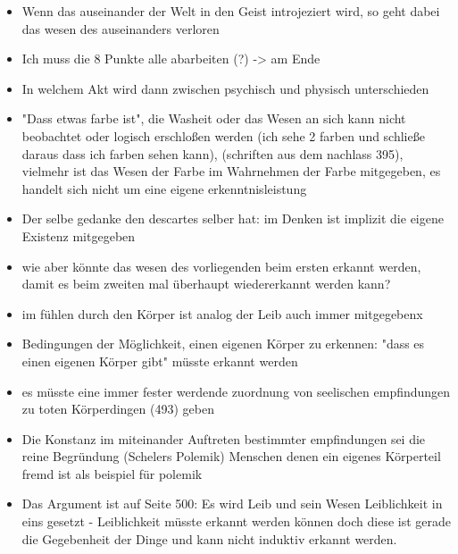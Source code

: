 \documentclass[a4paper, 12pt]{article}
\begin{document}
\begin{onehalfspace}
\begin{itemize}
  \item Wenn das auseinander der Welt in den Geist introjeziert wird, so geht dabei das wesen des auseinanders verloren 
  \item Ich muss die 8 Punkte alle abarbeiten (?) -> am Ende
  \item In welchem Akt wird dann zwischen psychisch und physisch unterschieden
  \item "Dass etwas farbe ist", die Washeit oder das Wesen an sich kann nicht beobachtet oder logisch erschloßen werden (ich sehe 2 farben und schließe daraus dass ich farben sehen kann), (schriften aus dem nachlass 395), vielmehr ist das Wesen der Farbe im Wahrnehmen der Farbe mitgegeben, es handelt sich nicht um eine eigene erkenntnisleistung
  \item Der selbe gedanke den descartes selber hat: im Denken ist implizit die eigene Existenz mitgegeben
  \item wie aber könnte das wesen des vorliegenden beim ersten erkannt werden, damit es beim zweiten mal überhaupt wiedererkannt werden kann?
  \item im fühlen durch den Körper ist analog der Leib auch immer mitgegebenx
  \item Bedingungen der Möglichkeit, einen eigenen Körper zu erkennen: "dass es einen eigenen Körper gibt" müsste erkannt werden
  \item es müsste eine immer fester werdende zuordnung von seelischen empfindungen zu toten Körperdingen (493) geben
  \item Die Konstanz im miteinander Auftreten bestimmter empfindungen sei die reine Begründung (Schelers Polemik) Menschen denen ein eigenes Körperteil fremd ist als beispiel für polemik
  \item Das Argument ist auf Seite 500: Es wird Leib und sein Wesen Leiblichkeit in eins gesetzt - Leiblichkeit müsste erkannt werden können doch diese ist gerade die Gegebenheit der Dinge und kann nicht induktiv erkannt werden.
\end{itemize}






\end{onehalfspace}
\end{document}
